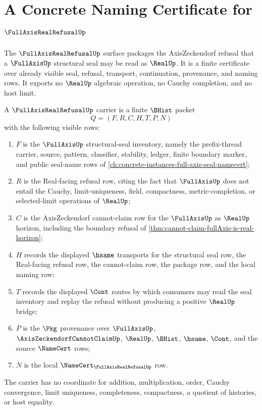\chapter{A Concrete Naming Certificate for $\FullAxisRealRefusalUp$}
\label{ch:concrete-instances-fullaxisrealrefusal-namecert}

The $\FullAxisRealRefusalUp$ surface packages the AxisZeckendorf refusal that a $\FullAxisUp$ structural seal may be read as $\RealUp$. It is a finite certificate over already visible seal, refusal, transport, continuation, provenance, and naming rows. It exports no $\RealUp$ algebraic operation, no Cauchy completion, and no host limit.

\begin{definition}
\label{def:fullaxis-real-refusal-carrier}
A $\FullAxisRealRefusalUp$ carrier is a finite $\BHist$ packet
$$
Q=(F,R,C,H,T,P,N)
$$
with the following visible rows:
\begin{enumerate}
\item $F$ is the $\FullAxisUp$ structural-seal inventory, namely the prefix-thread carrier, source, pattern, classifier, stability, ledger, finite boundary marker, and public seal-name rows of \autoref{ch:concrete-instances-full-axis-seal-namecert};
\item $R$ is the Real-facing refusal row, citing the fact that $\FullAxisUp$ does not entail the Cauchy, limit-uniqueness, field, compactness, metric-completion, or selected-limit operations of $\RealUp$;
\item $C$ is the AxisZeckendorf cannot-claim row for the $\FullAxisUp$ as $\RealUp$ horizon, including the boundary refusal of \autoref{thm:cannot-claim-fullAxis-is-real-horizon};
\item $H$ records the displayed $\hsame$ transports for the structural seal row, the Real-facing refusal row, the cannot-claim row, the package row, and the local naming row;
\item $T$ records the displayed $\Cont$ routes by which consumers may read the seal inventory and replay the refusal without producing a positive $\RealUp$ bridge;
\item $P$ is the $\Pkg$ provenance over $\FullAxisUp$, $\AxisZeckendorfCannotClaimUp$, $\RealUp$, $\BHist$, $\hsame$, $\Cont$, and the source $\NameCert$ rows;
\item $N$ is the local $\NameCert_{\FullAxisRealRefusalUp}$ row.
\end{enumerate}
The carrier has no coordinate for addition, multiplication, order, Cauchy convergence, limit uniqueness, completeness, compactness, a quotient of histories, or host equality.
\end{definition}

